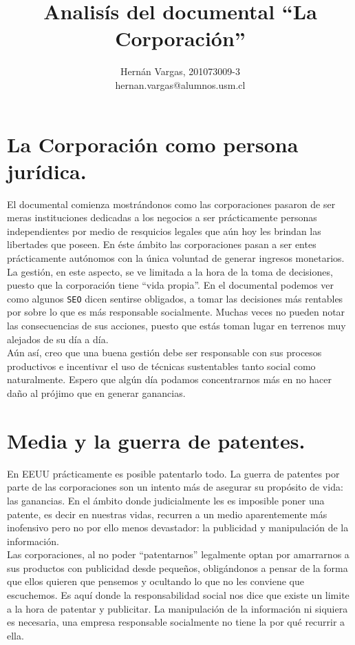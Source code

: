 \documentclass[spanish, fleqn]{article}
\title{ Analisís del documental ``La Corporación''}
\author{Hernán Vargas, 201073009-3 \\ hernan.vargas@alumnos.usm.cl}
\date{}
\begin{document}
	\maketitle
	\thispagestyle{empty}

	\thispagestyle{fancy}
	\section{La Corporación como persona jurídica.}
	El documental comienza mostrándonos como las corporaciones pasaron de ser 
	meras instituciones dedicadas a los negocios a ser prácticamente personas
	independientes por medio de resquicios legales que aún hoy les brindan las 
	libertades que poseen. En éste ámbito las corporaciones pasan a ser entes
	prácticamente autónomos con la única voluntad de generar ingresos
	monetarios.\\
	La gestión, en este aspecto, se ve limitada a la hora de la toma de 
	decisiones, puesto que la corporación tiene ``vida propia''. En el 
	documental podemos ver como algunos \texttt{SEO} dicen sentirse obligados,
	a tomar las decisiones más rentables por sobre lo que es más responsable 
	socialmente. Muchas veces no pueden notar las consecuencias de sus
	acciones, puesto que estás toman lugar en terrenos muy alejados de su día a
	día.\\
	Aún así, creo que una buena gestión debe ser responsable con sus procesos 
	productivos e incentivar el uso de técnicas sustentables tanto social
	como naturalmente. Espero que algún día podamos concentrarnos más en no
	hacer daño al prójimo que en generar ganancias.

	\section{Media y la guerra de patentes.}
	En EEUU prácticamente es posible patentarlo todo. La guerra de patentes por
	parte de las corporaciones son un intento más de asegurar su propósito de
	vida: las ganancias. En el ámbito donde judicialmente les es imposible
	poner una patente, es decir en nuestras vidas, recurren a un medio
	aparentemente más inofensivo pero no por ello menos devastador: la
	publicidad y manipulación de la información.\\
	Las corporaciones, al no poder ``patentarnos'' legalmente optan por 
	amarrarnos a sus productos con publicidad desde pequeños, obligándonos a 
	pensar de la forma que ellos quieren que pensemos y ocultando lo que no les
	conviene que escuchemos. Es aquí donde la responsabilidad social nos dice 
	que existe un limite a la hora de patentar y publicitar. La manipulación de
	la información ni siquiera es necesaria, una empresa responsable socialmente
	no tiene la por qué recurrir a ella.
\end{document}
